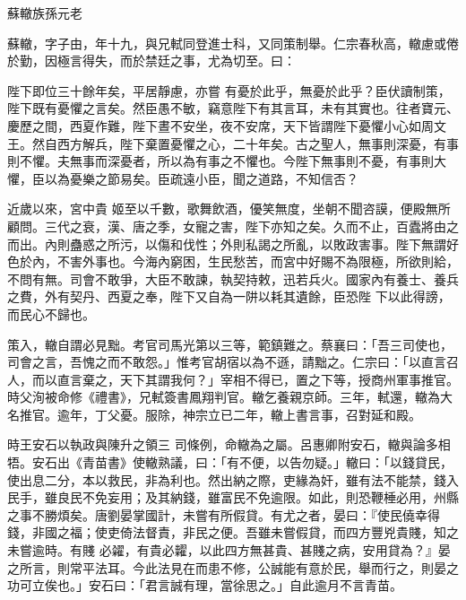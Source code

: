 
\begin{pinyinscope}

 蘇轍族孫元老



 蘇轍，字子由，年十九，與兄軾同登進士科，又同策制舉。仁宗春秋高，轍慮或倦於勤，因極言得失，而於禁廷之事，尤為切至。曰：



 陛下即位三十餘年矣，平居靜慮，亦嘗
 有憂於此乎，無憂於此乎？臣伏讀制策，陛下既有憂懼之言矣。然臣愚不敏，竊意陛下有其言耳，未有其實也。往者寶元、慶歷之間，西夏作難，陛下晝不安坐，夜不安席，天下皆謂陛下憂懼小心如周文王。然自西方解兵，陛下棄置憂懼之心，二十年矣。古之聖人，無事則深憂，有事則不懼。夫無事而深憂者，所以為有事之不懼也。今陛下無事則不憂，有事則大懼，臣以為憂樂之節易矣。臣疏遠小臣，聞之道路，不知信否？



 近歲以來，宮中貴
 姬至以千數，歌舞飲酒，優笑無度，坐朝不聞咨謨，便殿無所顧問。三代之衰，漢、唐之季，女寵之害，陛下亦知之矣。久而不止，百蠹將由之而出。內則蠱惑之所污，以傷和伐性；外則私謁之所亂，以敗政害事。陛下無謂好色於內，不害外事也。今海內窮困，生民愁苦，而宮中好賜不為限極，所欲則給，不問有無。司會不敢爭，大臣不敢諫，執契持敕，迅若兵火。國家內有養士、養兵之費，外有契丹、西夏之奉，陛下又自為一阱以耗其遺餘，臣恐陛
 下以此得謗，而民心不歸也。



 策入，轍自謂必見黜。考官司馬光第以三等，範鎮難之。蔡襄曰：「吾三司使也，司會之言，吾愧之而不敢怨。」惟考官胡宿以為不遜，請黜之。仁宗曰：「以直言召人，而以直言棄之，天下其謂我何？」宰相不得已，置之下等，授商州軍事推官。時父洵被命修《禮書》，兄軾簽書鳳翔判官。轍乞養親京師。三年，軾還，轍為大名推官。逾年，丁父憂。服除，神宗立已二年，轍上書言事，召對延和殿。



 時王安石以執政與陳升之領三
 司條例，命轍為之屬。呂惠卿附安石，轍與論多相牾。安石出《青苗書》使轍熟議，曰：「有不便，以告勿疑。」轍曰：「以錢貸民，使出息二分，本以救民，非為利也。然出納之際，吏緣為奸，雖有法不能禁，錢入民手，雖良民不免妄用；及其納錢，雖富民不免逾限。如此，則恐鞭棰必用，州縣之事不勝煩矣。唐劉晏掌國計，未嘗有所假貸。有尤之者，晏曰：『使民僥幸得錢，非國之福；使吏倚法督責，非民之便。吾雖未嘗假貸，而四方豐兇貴賤，知之未嘗逾時。有賤
 必糴，有貴必糶，以此四方無甚貴、甚賤之病，安用貸為？』晏之所言，則常平法耳。今此法見在而患不修，公誠能有意於民，舉而行之，則晏之功可立俟也。」安石曰：「君言誠有理，當徐思之。」自此逾月不言青苗。




\end{pinyinscope}
